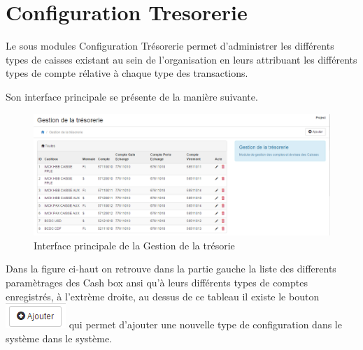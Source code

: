 \documentclass[12pt,a4paper]{report}
\begin{document}
\newpage
\section{Configuration Tresorerie}
Le sous modules Configuration Trésorerie permet d'administrer les différents types de caisses existant au sein de l'organisation en leurs attribuant les différents types de compte rélative à chaque type des transactions.

Son interface principale se présente de la manière suivante.

\begin{figure}[h]
\begin{center}
\includegraphics[width=14cm]{pic/ComptDevise.png}
\end{center}
\caption{Interface principale de la Gestion de la trésorie}
\label{Interface principale de la Gestion de la trésorerie}
\end{figure} 

Dans la figure ci-haut on retrouve dans la partie gauche la liste des differents paramètrages des Cash box ansi qu'à leurs différents types de comptes enregistrés, à l'extrème droite, au dessus de ce tableau il existe le bouton \includegraphics[scale=1]{pic/AddNewStore.png} qui permet d'ajouter une nouvelle type de configuration dans le système dans le système.
\end{document}
